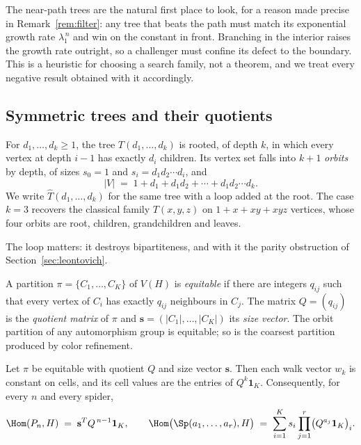 \begin{remark}
  \label{rem:why-nearpath}
  The near-path trees are the natural first place to look, for a reason
  made precise in Remark~\ref{rem:filter}: any tree that beats the path must
  match its exponential growth rate $\lambda_1^{\,n}$ and win on the
  constant in front. Branching in the interior raises the growth rate
  outright, so a challenger must confine its defect to the boundary.
  This is a heuristic for choosing a search family, not a theorem, and
  we treat every negative result obtained with it accordingly.
\end{remark}

\subsection{Symmetric trees and their quotients}

\begin{definition}
  \label{def:symtree}
  For $d_1,\dots,d_k \ge 1$, the tree $T(d_1,\dots,d_k)$ is rooted, of
  depth $k$, in which every vertex at depth $i-1$ has exactly $d_i$
  children. Its vertex set falls into $k+1$ \emph{orbits} by depth, of
  sizes $s_0 = 1$ and $s_i = d_1 d_2 \cdots d_i$, and
  \[
    |V| \;=\; 1 + d_1 + d_1 d_2 + \cdots + d_1 d_2 \cdots d_k .
  \]
  We write $\hat T(d_1,\dots,d_k)$ for the same tree with a loop added at
  the root. The case $k = 3$ recovers the classical family
  $T(x,y,z)$ on $1 + x + xy + xyz$ vertices, whose four orbits are root,
  children, grandchildren and leaves.
\end{definition}

The loop matters: it destroys bipartiteness, and with it the parity
obstruction of Section~\ref{sec:leontovich}.

\begin{definition}
  \label{def:quotient}
  A partition $\pi = \{C_1,\dots,C_K\}$ of $V(H)$ is \emph{equitable} if
  there are integers $q_{ij}$ such that every vertex of $C_i$ has exactly
  $q_{ij}$ neighbours in $C_j$. The matrix $Q = (q_{ij})$ is the
  \emph{quotient matrix} of $\pi$ and $\mathbf{s} = (|C_1|,\dots,|C_K|)$
  its \emph{size vector}. The orbit partition of any automorphism group
  is equitable; so is the coarsest partition produced by color refinement.
\end{definition}

\begin{lemma}
  \label{lem:quotient}
  Let $\pi$ be equitable with quotient $Q$ and size vector $\mathbf{s}$.
  Then each walk vector $w_k$ is constant on cells, and its cell values
  are the entries of $Q^k \mathbf{1}_K$. Consequently, for every $n$ and
  every spider,
  \[
    \Hom(P_n,H) \;=\; \mathbf{s}^{T} Q^{\,n-1}\mathbf{1}_K,
    \qquad
    \Hom\bigl(\Sp(a_1,\dots,a_r),H\bigr)
      \;=\; \sum_{i=1}^{K} s_i \prod_{j=1}^{r} \bigl(Q^{a_j}\mathbf{1}_K\bigr)_i .
  \]
\end{lemma}

